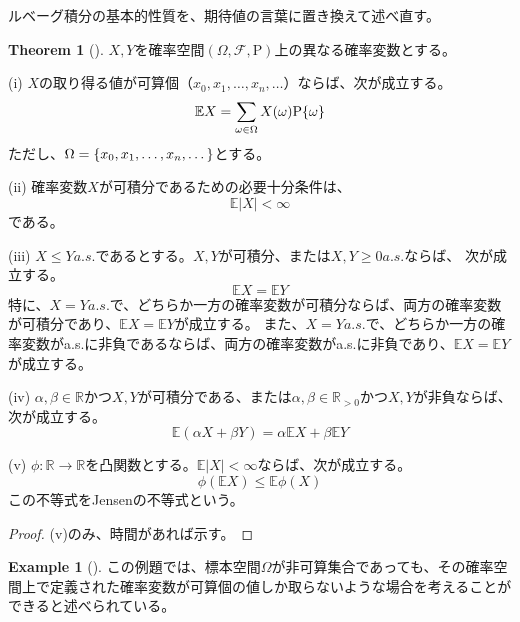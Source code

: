 \documentclass{ltjsarticle}
\numberwithin{equation}{subsection}
\theoremstyle{definition}
\newtheorem{thm}[dfn]{Theorem}
\newtheorem{ex}[dfn]{Example}
\begin{document}
ルベーグ積分の基本的性質を、期待値の言葉に置き換えて述べ直す。
\begin{thm}[]
    $X,Y$を確率空間$(\Omega , \mathcal{F} , \mathrm{P})$上の異なる確率変数とする。


    (i) $X$の取り得る値が可算個（$x_0, x_1, \dots, x_n, \dots$）ならば、次が成立する。
    \begin{equation}
        \mathbb{E}X = \sum_{\omega \in \Omega} X(\omega) \mathrm{P} \qty{\omega}
    \end{equation}
    ただし、$\Omega = \qty{x_0, x_1, \dots, x_n, \dots}$とする。


    (ii) 確率変数$X$が可積分であるための必要十分条件は、
    \begin{equation}
        \mathbb{E} |X| < \infty
    \end{equation}
    である。


    (iii) $X \leq Y a.s.$であるとする。$X, Y$が可積分、または$X, Y \geq 0 a.s.$ならば、
    次が成立する。
    \begin{equation}
        \mathbb{E} X = \mathbb{E} Y
    \end{equation}
    特に、$X=Y a.s.$で、どちらか一方の確率変数が可積分ならば、両方の確率変数が可積分であり、$\mathbb{E} X = \mathbb{E} Y$が成立する。
    また、$X=Y a.s.$で、どちらか一方の確率変数がa.s.に非負であるならば、両方の確率変数がa.s.に非負であり、$\mathbb{E} X = \mathbb{E} Y$が成立する。


    (iv) $\alpha, \beta \in \mathbb{R}$かつ$X,Y$が可積分である、または$\alpha, \beta \in \mathbb{R}_{>0}$かつ$X,Y$が非負ならば、次が成立する。
    \begin{equation}
        \mathbb{E}(\alpha X + \beta Y) = \alpha \mathbb{E}X + \beta \mathbb{E}Y
    \end{equation}


    (v) $\phi: \mathbb{R} \to \mathbb{R}$を凸関数とする。$\mathbb{E}|X| < \infty$ならば、次が成立する。
    \begin{equation}
        \phi(\mathbb{E}X) \leq \mathbb{E}\phi(X)
    \end{equation}
    この不等式をJensenの不等式という。
\end{thm}

\begin{proof}
    (v)のみ、時間があれば示す。
\end{proof}

\begin{ex}[]
    この例題では、標本空間$\Omega$が非可算集合であっても、その確率空間上で定義された確率変数が可算個の値しか取らないような場合を考えることができると述べられている。
\end{ex}
\end{document}
